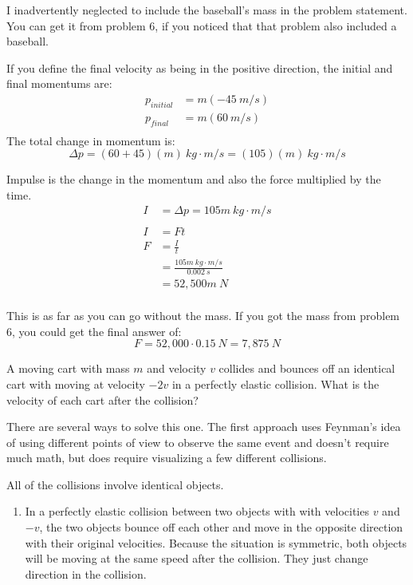 \documentclass[fleqn,addpoints]{exam}
\begin{document}
\begin{questions}
\begin{solution}
I inadvertently neglected to include the baseball's mass in the problem statement.  You can get it from problem 6, if
you noticed that that problem also included a baseball.

If you define the final velocity as being in the positive direction, the initial and final momentums are:
\begin{align*}
  p_{initial} &= m (-45 \ m/s) \\
  p_{final}   &= m (60 \ m/s) \\
\end{align*}
The total change in momentum is:
\[
  \Delta p = (60 + 45 )(m) \ kg \cdot m/s = (105)(m) \ kg \cdot m/s 
\]

Impulse is the change in the momentum and also the force multiplied by the time.
\begin{align*}
  I &= \Delta p = 105m \ kg \cdot m/s \\
  \\
  I &= Ft \\
  F &= \frac{I}{t} \\
    &= \frac{105 m \ kg \cdot m/s}{0.002 \ s} \\
    &= 52,500 m \ N\\
\end{align*}

This is as far as you can go without the mass.  If you got the mass from problem 6, you could get the final answer of:
\[
  F = 52,000 \cdot 0.15 \ N = 7,875 \ N
\]

\end{solution}

\bonusquestion[5] A moving cart with mass $m$ and velocity $v$ collides and
bounces off an identical cart with moving at velocity $-2v$ in a perfectly
elastic collision.  What is the velocity of each cart after the collision?

\begin{solution}
There are several ways to solve this one.  The first approach uses Feynman's idea of using different points of view to
observe the same event and doesn't require much math, but does require visualizing a few different collisions.

All of the collisions involve identical objects.

\begin{enumerate}
\item In a perfectly elastic collision between two objects with with velocities $v$ and $-v$, the two objects bounce
  off each other and move in the opposite direction with their original velocities.  Because the situation is symmetric,
  both objects will be moving at the same speed after the collision.  They just change direction in the collision.


\end{enumerate}
\end{solution}
\end{questions}
\end{document}
